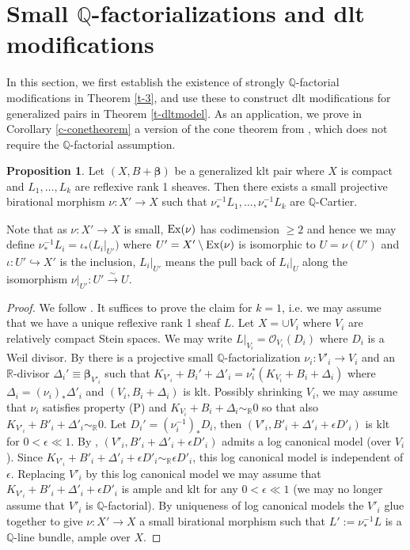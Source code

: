 \documentclass[11pt]{amsart}
\numberwithin{equation}{section}
\def\bbeta{\boldsymbol{\beta}}
\def\OO{\mathcal O}
\newcommand\Q{{\mathbb{Q}}}
\newcommand\R{{\mathbb{R}}}
\theoremstyle{definition}
\theoremstyle{definition}
\newtheorem{proposition}[theorem]{Proposition}
\theoremstyle{definition}
\begin{document}

\section{Small $\mathbb{Q}$-factorializations and dlt modifications}


In this section, we first establish the existence of strongly $\Q$-factorial modifications in Theorem \ref{t-3}, and use these to construct dlt modifications for generalized pairs in Theorem \ref{t-dltmodel}. As an application, we prove in Corollary \ref{c-conetheorem} a version of the cone theorem from \cite{HP24}, which does not require the $\Q$-factorial assumption.

\begin{proposition}\label{t-2} Let $(X,B+\bbeta)$ be a generalized klt pair where $X$ is compact and $L_1,\ldots,L_k$ are reflexive rank 1 sheaves. Then there exists a small projective  birational morphism $\nu :X'\to X$ such that $\nu ^{-1}_*L_1,\ldots ,\nu ^{-1}_*L_k$ are $\Q$-Cartier.
\end{proposition}
Note that as $\nu :X'\to X$ is small, ${\rm Ex}(\nu)$ has codimension $\geq 2$ and hence we may define $\nu ^{-1}_*L_i=\iota_*\bigl(L_i|_{U'}\bigr)$ where $U'=X'\setminus {\rm Ex}(\nu)$ is isomorphic to $U=\nu (U')$ and $\iota:U'\hookrightarrow X'$ is the inclusion, $L_i|_{U'}$ means the pull back of $L_i|_{U}$ along the isomorphism $\nu|_{U'}:U' \stackrel{\sim}\to U$.
\begin{proof} We follow \cite[Lemma 5.7]{DH23}. It suffices to prove the claim for $k=1$, i.e. we may assume that we have a unique reflexive rank 1 sheaf $L$. Let  $X=\cup V_i$ where $V_i$ are relatively compact Stein spaces. We may write $L|_{V_i}=\OO _{V_i}(D_i)$ where $D_i$ is a Weil divisor. 
By \cite[Theorem 2.19] {DHY23} there is a projective small $\Q$-factorialization $\nu _i:V'_i\to V_i$ and an $\R$-divisor $\Delta _i'\equiv \bbeta _{V'_i}$ such that $K_{V'_i}+B_i'+\Delta '_i=\nu _i^*(K_{V_i}+B_i+\Delta _i)$ where $\Delta _i=(\nu _i)_*\Delta '_i$ and $(V_i,B_i+\Delta _i)$ is klt. 
Possibly shrinking $V_i$, we may assume that $\nu_i$ satisfies  property (P) and $K_{V_i}+B_i+\Delta _i\sim _\R0$ so that also
$K_{V'_i}+B'_i+\Delta' _i\sim _\R 0$. Let $D_i'=(\nu _i^{-1})_*D_i$, then $(V'_i,B'_i+\Delta ' _i+\epsilon D'_i)$ is klt for $0<\epsilon \ll 1$. 
By \cite[Theorem 1.8]{Fuj22}, $(V'_i,B'_i+\Delta ' _i+\epsilon D'_i)$ admits a log canonical model (over $V_i$). Since $K_{V'_i}+B'_i+\Delta ' _i+\epsilon D'_i\sim _\R \epsilon D'_i$, this log canonical model is independent of $\epsilon$.
Replacing $V'_i$ by this log canonical model we may assume that $K_{V'_i}+B'_i+\Delta ' _i+\epsilon D'_i$ is ample and klt for any $0<\epsilon \ll 1$ (we may no longer assume that $V'_i$ is $\Q$-factorial).
By uniqueness of log canonical models the $V'_i$ glue together to give $\nu:X'\to X$ a small birational morphism such that $L':=\nu ^{-1}_*L$ is a $\Q$-line bundle, ample over $X$. 
\end{proof}
\end{document}
